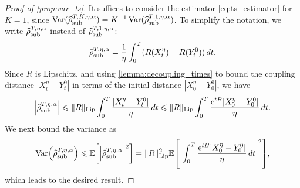 \documentclass[11pt]{article}
\newcommand{\E}{\mathbb{E}}
\newcommand{\e}{\mathrm{e}}
\renewcommand{\leq}{\leqslant}
\DeclareMathOperator{\Var}{Var}
\DeclarePairedDelimiter\abs{\lvert}{\rvert}
\DeclarePairedDelimiter\paren{\lparen}{\rparen}
\DeclarePairedDelimiter\bkt{\lbrack}{\rbrack}
\theoremstyle{definition}
\newcommand{\RLip}{\|R\|_{\rm Lip}}
\newcommand{\estTmp}{\widehat{\rho}}
\newcommand{\asTSest}{\estTmp^{T,\eta,\alpha}_{\rm sub}} %
\newcommand{\aTSest}{\estTmp^{T,K,\eta,\alpha}_{\rm sub}} %
\begin{document}
\begin{proof}[Proof of \cref{prop:var_ts}]
It suffices to consider the estimator \eqref{eq:ts_estimator} for $K=1$, since $\Var(\aTSest) = K^{-1}\Var(\widehat{\rho}^{T,1,\eta,\alpha}_{\rm sub})$. To simplify the notation, we write $\asTSest$ instead of $\widehat{\rho}^{T,1,\eta,\alpha}_{\rm sub}$:
\begin{equation}
    \notag
		\asTSest = \frac{1}{\eta}\int_0^T (R(X_t^\eta) - R(Y_t^0)) \, dt.
	\end{equation}
Since $R$ is Lipschitz, and using \cref{lemma:decoupling_times} to bound the coupling distance $|X_t^\eta - Y_t^0|$ in terms of the initial distance $|X_0^\eta - Y_0^0|$, we have
\begin{align}
    \notag
		\label{eq:rhoLipschitz}
		\abs*{\asTSest} \leq \RLip \int_0^T \frac{|X_t^\eta - Y_t^0|}{\eta} \, dt \leq \RLip \int_0^T \frac{\e^{tB}|X_0^\eta - Y_0^0|}{\eta} \, dt.
\end{align}
We next bound the variance as
\begin{align}
    \notag
		\Var\paren*{\asTSest} 
\leq \E\bkt*{\abs*{\asTSest}^2} = \RLip^2\E\bkt*{\abs*{\int_0^T \frac{\e^{tB}|X_0^\eta - Y_0^0|}{\eta} \, dt}^2},
\end{align}
which leads to the desired result.
\end{proof}
\end{document}
